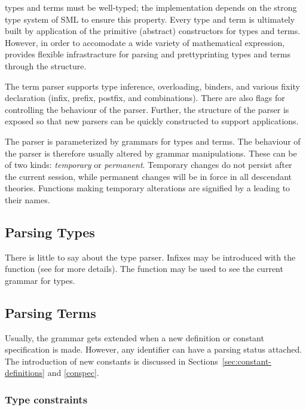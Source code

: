 {\HOL{} types and terms must be well-typed; the \HOL{} implementation
depends on the strong type system of SML to ensure this property.
Every type and term is ultimately built by application of the
primitive (abstract) constructors for types and terms. However, in
order to accomodate a wide variety of mathematical expression,
\HOL{} provides flexible infrastracture for parsing and prettyprinting
types and terms through the  structure.

The term parser supports type inference, overloading, binders, and
various fixity declaration (infix, prefix, postfix, and
combinations). There are also flags for controlling the behaviour
of the parser. Further, the structure of the parser is exposed so that
new parsers can be quickly constructed to support applications.

The parser is parameterized by grammars for types and terms. The
behaviour of the parser is therefore usually altered by grammar
manipulations. These can be of two kinds: \emph{temporary} or
\emph{permanent}.  Temporary changes do not persist after the current
session, while permanent changes will be in force in all descendant
theories.  Functions making temporary alterations are signified
by a leading  to their names.

\subsection{Parsing Types}

There is little to say about the type parser. Infixes may be
introduced with the function  (see \REFERENCE{}
for more details).  The function  may be used to
see the current grammar for types.

\subsection{Parsing Terms}

Usually, the \HOL{} grammar gets extended when a new definition or
constant specification is made. However, any identifier can have a
parsing status attached. The introduction of new constants is
discussed in Sections~\ref{sec:constant-definitions} and
\ref{conspec}.


\subsubsection{Type constraints}

}
